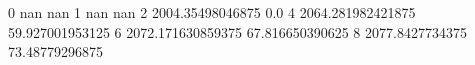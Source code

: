 0 nan nan
1 nan nan
2 2004.35498046875 0.0
4 2064.281982421875 59.927001953125
6 2072.171630859375 67.816650390625
8 2077.8427734375 73.48779296875
